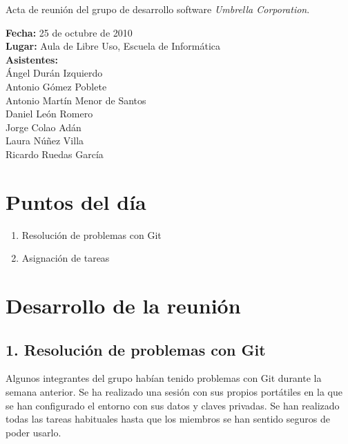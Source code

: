 \documentclass[a4paper,11pt,oneside]{article}
\begin{document}
\pagestyle{fancy}


\begin{center}
{\Large
Acta de reunión del grupo de desarrollo software \textit{Umbrella
Corporation}.}
\end{center}
\textbf{Fecha:} 25 de octubre de 2010\\
\textbf{Lugar:} Aula de Libre Uso, Escuela de Informática\\
\textbf{Asistentes:}\\
\hspace*{1cm}Ángel Durán Izquierdo\\
\hspace*{1cm}Antonio Gómez Poblete\\
\hspace*{1cm}Antonio Martín Menor de Santos\\
\hspace*{1cm}Daniel León Romero\\
\hspace*{1cm}Jorge Colao Adán\\
\hspace*{1cm}Laura Núñez Villa\\
\hspace*{1cm}Ricardo Ruedas García


\section*{Puntos del día}

\begin{enumerate}
\item Resolución de problemas con Git
\item Asignación de tareas
\end{enumerate}


\section*{Desarrollo de la reunión}

\subsection*{1. Resolución de problemas con Git}

Algunos integrantes del grupo habían tenido problemas con Git durante la semana
anterior. Se ha realizado una sesión con sus propios portátiles en la que se
han configurado el entorno con sus datos y claves privadas. Se han realizado
todas las tareas habituales hasta que los miembros se han sentido seguros de
poder usarlo.
\end{document}

